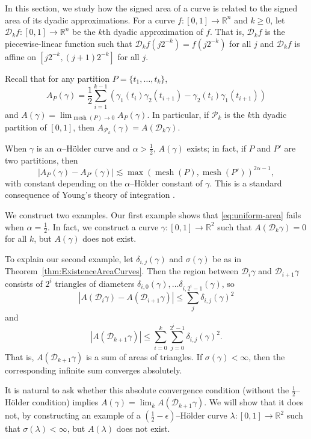 \documentclass[12pt,reqno]{amsart}
\newcommand{\cP}{\mathcal{P}}
\newcommand{\cD}{\mathcal{D}}
\DeclareMathOperator{\mesh}{mesh}
\newcommand{\R}{\mathbb{R}}
\newcommand{\from}{\colon}
\theoremstyle{remark}
\newcommand{\0}{\mathbf{0}}
\renewcommand{\1}{\mathbf 1}
\begin{document}
In this section, we study how the signed area of a curve is related to the signed area of its dyadic approximations. For a curve $f\from [0,1]\to \R^n$ and $k \ge 0$, let $\cD_kf\from [0,1]\to \R^n$ be the $k$th dyadic approximation of $f$. That is, $\cD_k f$ is the piecewise-linear function such that $\cD_k f(j2^{-k}) = f(j 2^{-k})$ for all $j$ and $\cD_k f$ is affine on $[j2^{-k}, (j+1)2^{-k}]$ for all $j$.

Recall that for any partition $P=\{t_1,\dots, t_k\}$, 
$$A_P(\gamma) = \frac{1}{2}\sum_{i=1}^{k-1} (\gamma_1(t_i) \gamma_2(t_{i+1}) - \gamma_2(t_i) \gamma_1(t_{i+1}))$$
and $A(\gamma) = \lim_{\mesh(P)\to 0} A_P(\gamma)$. In particular, if $\cP_k$ is the $k$th dyadic partition of $[0,1]$, then $A_{\cP_k}(\gamma) = A(\cD_k\gamma)$.

When $\gamma$ is an $\alpha$--Hölder curve and $\alpha > \frac{1}{2}$, $A(\gamma)$ exists; in fact, if $P$ and $P'$ are two partitions, then
\begin{equation}\label{eq:uniform-area}
  |A_P(\gamma) - A_{P'}(\gamma)| \lesssim \max(\mesh(P),\mesh(P'))^{2\alpha - 1},
\end{equation}
with constant depending on the $\alpha$--Hölder constant of $\gamma$. 
This is a standard consequence of Young’s theory of integration \cite{YoungIntegral}.

We construct two examples. Our first example shows that \eqref{eq:uniform-area} fails when $\alpha=\frac{1}{2}$. In fact, we construct a curve $\gamma\from [0,1]\to \R^2$ such that $A(\cD_k\gamma) = 0$ for all $k$, but $A(\gamma)$ does not exist.

To explain our second example, let $\delta_{i,j}(\gamma)$ and $\sigma(\gamma)$ be as in Theorem~\ref{thm:ExistenceAreaCurves}. Then the region between $\cD_i\gamma$ and $\cD_{i+1}\gamma$ consists of $2^i$ triangles of diameters $\delta_{i,0}(\gamma),\dots \delta_{i,2^{i}-1}(\gamma)$, so
$$|A(\cD_i\gamma) - A(\cD_{i+1}\gamma)| \le \sum_j \delta_{i,j}(\gamma)^2$$
and
$$|A(\cD_{k+1}\gamma)| \le \sum_{i=0}^k \sum_{j=0}^{2^i-1} \delta_{i,j}(\gamma)^2.$$
That is, $A(\cD_{k+1}\gamma)$ is a sum of areas of triangles. If $\sigma(\gamma) < \infty$, then the corresponding infinite sum converges absolutely.

It is natural to ask whether this absolute convergence condition (without the $\frac{1}{2}$--Hölder condition) implies $A(\gamma) = \lim_k A(\cD_{k+1}\gamma)$. We will show that it does not, by constructing an example of a $(\frac{1}{2}-\epsilon)$--Hölder curve $\lambda\from [0,1]\to \R^2$ such that $\sigma(\lambda) < \infty$, but $A(\lambda)$ does not exist.
\end{document}

